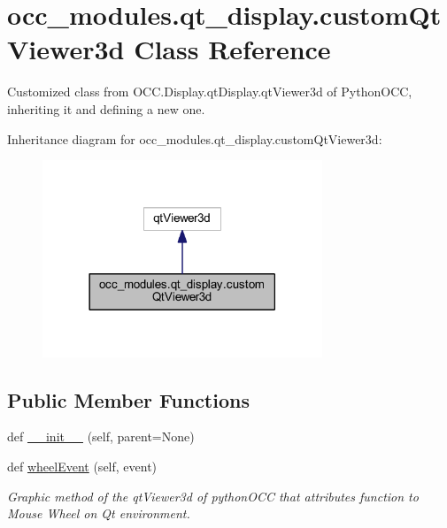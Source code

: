 \hypertarget{classocc__modules_1_1qt__display_1_1custom_qt_viewer3d}{}\section{occ\+\_\+modules.\+qt\+\_\+display.\+custom\+Qt\+Viewer3d Class Reference}
\label{classocc__modules_1_1qt__display_1_1custom_qt_viewer3d}


Customized class from O\+C\+C.\+Display.\+qt\+Display.\+qt\+Viewer3d of Python\+O\+CC, inheriting it and defining a new one.  




Inheritance diagram for occ\+\_\+modules.\+qt\+\_\+display.\+custom\+Qt\+Viewer3d\+:\nopagebreak
\begin{figure}[H]
\begin{center}
\leavevmode
\includegraphics[width=237pt]{classocc__modules_1_1qt__display_1_1custom_qt_viewer3d__inherit__graph}
\end{center}
\end{figure}
\subsection*{Public Member Functions}
\begin{DoxyCompactItemize}
\item 
def \hyperlink{classocc__modules_1_1qt__display_1_1custom_qt_viewer3d_aeef3c40364ac364d1ffc5ba3f5122964}{\+\_\+\+\_\+init\+\_\+\+\_\+} (self, parent=None)
\item 
def \hyperlink{classocc__modules_1_1qt__display_1_1custom_qt_viewer3d_a2031b7d19b3a0c4b0f54fc90218bcdd8}{wheel\+Event} (self, event)
\begin{DoxyCompactList}\small\item\em Graphic method of the qt\+Viewer3d of python\+O\+CC that attributes function to Mouse Wheel on Qt environment. \end{DoxyCompactList}\end{DoxyCompactItemize}



